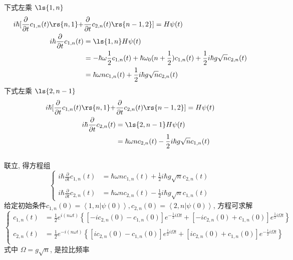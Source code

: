     \begin{frame} 
    \frametitle{}
    下式左乘 $\ls{1,n}$
    \[ \begin{aligned}
        i \hbar [\frac{\partial }{\partial t}c_{1,n}(t) \rs{n, 1} + &\frac{\partial }{\partial t}c_{2,n}(t) \rs{n-1, 2}] = H \psi(t) \\ 
        i \hbar \frac{\partial }{\partial t}c_{1,n}(t) &= \ls{1,n} H \psi(t) \\ 
        &= -\hbar \omega \frac{1}{2}c_{1,n}(t) + \hbar \omega_0 (n +\frac{1}{2})c_{1,n}(t) + \frac{1}{2} i\hbar g \sqrt{n} c_{2,n}(t) \\ 
        &=  \hbar \omega n c_{1,n}(t) + \frac{1}{2} i\hbar g \sqrt{n} c_{2,n}(t)
      \end{aligned}\] 
      下式左乘 $\ls{2,n-1}$
      \[ \begin{aligned}
          i \hbar [\frac{\partial }{\partial t}c_{1,n}(t) \rs{n, 1} +& \frac{\partial }{\partial t}c_{2,n}(t) \rs{n-1, 2}] = H \psi(t) \\ 
          i \hbar \frac{\partial }{\partial t}c_{2,n}(t) &= \ls{2,n-1} H \psi(t) \\ 
          &=  \hbar \omega n c_{2,n}(t) - \frac{1}{2} i\hbar g \sqrt{n} c_{1,n}(t) 
        \end{aligned}\] 
    \end{frame}

    \begin{frame} 
    \frametitle{}
         联立, 得方程组
        \[ \begin{cases}
            i \hbar \frac{\partial }{\partial t}c_{1,n}(t) &=\hbar \omega n c_{1,n}(t) + \frac{1}{2} i\hbar g \sqrt{n} c_{2,n}(t) \\ 
            &~ \\ 
            i \hbar \frac{\partial }{\partial t}c_{2,n}(t) &=\hbar \omega n c_{2,n}(t) - \frac{1}{2} i\hbar g \sqrt{n} c_{1,n}(t) 
        \end{cases} \]
        给定初始条件$c_{1,n}(0) = \left\langle 1,n|\psi(0) \right\rangle ,c_{2,n}(0)=\left\langle 2,n|\psi(0) \right\rangle$, 方程可求解 
    \[\begin{cases}
        c_{1,n}(t) &= \frac{1}{2} e^{ i (n \omega t)} \left\{ [ -i c_{2,n}(0) - c_{1,n}(0)] e^{-\frac{1}{2} i \Omega t}  + [ -i c_{2,n}(0) + c_{1,n}(0)] e^{\frac{1}{2} i \Omega t}\right\} \\
        ~ \\
        c_{2,n}(t) &= \frac{1}{2} e^{- i (n \omega t)} \left\{ [ i c_{2,n}(0) - c_{1,n}(0)] e^{\frac{1}{2} i \Omega t}  + [ i c_{2,n}(0) + c_{1,n}(0)] e^{-\frac{1}{2} i \Omega t}\right\} \\
    \end{cases} \]
    式中 $\Omega = g \sqrt{n}$, 是拉比频率
    \end{frame}

